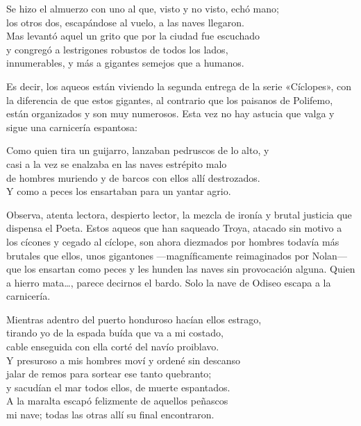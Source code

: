 \begin{versocita}
Se hizo el almuerzo con uno al que, visto y no visto, echó mano;\\
los otros dos, escapándose al vuelo, a las naves llegaron.\\
Mas levantó aquel un grito que por la ciudad fue escuchado\\
y congregó a lestrigones robustos de todos los lados,\\
innumerables, y más a gigantes semejos que a humanos.
\end{versocita}

Es decir, los aqueos están viviendo la segunda entrega de la serie «Cíclopes», con la diferencia de que estos gigantes, al contrario que los paisanos de Polifemo, están organizados y son muy numerosos. Esta vez no hay astucia que valga y sigue una carnicería espantosa:

\begin{versocita}
Como quien tira un guijarro, lanzaban pedruscos de lo alto, y\\
casi a la vez se enalzaba en las naves estrépito malo\\
de hombres muriendo y de barcos con ellos allí destrozados.\\
Y como a peces los ensartaban para un yantar agrio.
\end{versocita}

Observa, atenta lectora, despierto lector, la mezcla de ironía y brutal justicia que dispensa el Poeta. Estos aqueos que han saqueado Troya, atacado sin motivo a los cícones y cegado al cíclope, son ahora diezmados por hombres todavía más brutales que ellos, unos gigantones ---magníficamente reimaginados por Nolan--- que los ensartan como peces y les hunden las naves sin provocación alguna. Quien a hierro mata…, parece decirnos el bardo. Solo la nave de Odiseo escapa a la carnicería.

\begin{versocita}
Mientras adentro del puerto honduroso hacían ellos estrago,\\
tirando yo de la espada buída que va a mi costado,\\
cable enseguida con ella corté del navío proiblavo.\\
Y presuroso a mis hombres moví y ordené sin descanso\\
jalar de remos para sortear ese tanto quebranto;\\
y sacudían el mar todos ellos, de muerte espantados.\\
A la maralta escapó felizmente de aquellos peñascos\\
mi nave; todas las otras allí su final encontraron.
\end{versocita}

